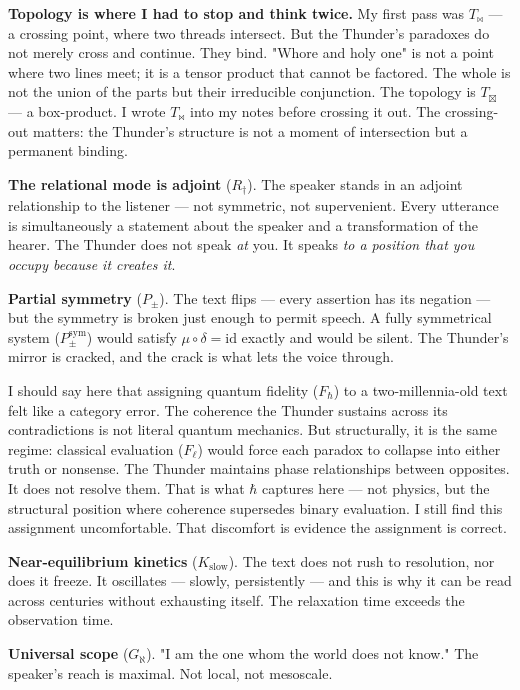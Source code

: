 \documentclass[12pt,a4paper]{article}
\begin{document}
\textbf{Topology is where I had to stop and think twice.} My first pass was $T_{\bowtie}$ --- a crossing point, where two threads intersect. But the Thunder's paradoxes do not merely cross and continue. They bind. "Whore and holy one" is not a point where two lines meet; it is a tensor product that cannot be factored. The whole is not the union of the parts but their irreducible conjunction. The topology is $T_{\boxtimes}$ --- a box-product. I wrote $T_{\bowtie}$ into my notes before crossing it out. The crossing-out matters: the Thunder's structure is not a moment of intersection but a permanent binding.

\textbf{The relational mode is adjoint} ($R_{\dagger}$). The speaker stands in an adjoint relationship to the listener --- not symmetric, not supervenient. Every utterance is simultaneously a statement about the speaker and a transformation of the hearer. The Thunder does not speak \emph{at} you. It speaks \emph{to a position that you occupy because it creates it}.

\textbf{Partial symmetry} ($P_{\pm}$). The text flips --- every assertion has its negation --- but the symmetry is broken just enough to permit speech. A fully symmetrical system ($P_{\pm}^{\text{sym}}$) would satisfy $\mu \circ \delta = \text{id}$ exactly and would be silent. The Thunder's mirror is cracked, and the crack is what lets the voice through.

I should say here that assigning quantum fidelity ($F_{\hbar}$) to a two-millennia-old text felt like a category error. The coherence the Thunder sustains across its contradictions is not literal quantum mechanics. But structurally, it is the same regime: classical evaluation ($F_{\ell}$) would force each paradox to collapse into either truth or nonsense. The Thunder maintains phase relationships between opposites. It does not resolve them. That is what $\hbar$ captures here --- not physics, but the structural position where coherence supersedes binary evaluation. I still find this assignment uncomfortable. That discomfort is evidence the assignment is correct.

\textbf{Near-equilibrium kinetics} ($K_\text{slow}$). The text does not rush to resolution, nor does it freeze. It oscillates --- slowly, persistently --- and this is why it can be read across centuries without exhausting itself. The relaxation time exceeds the observation time.

\textbf{Universal scope} ($G_{\aleph}$). "I am the one whom the world does not know." The speaker's reach is maximal. Not local, not mesoscale.
\end{document}
